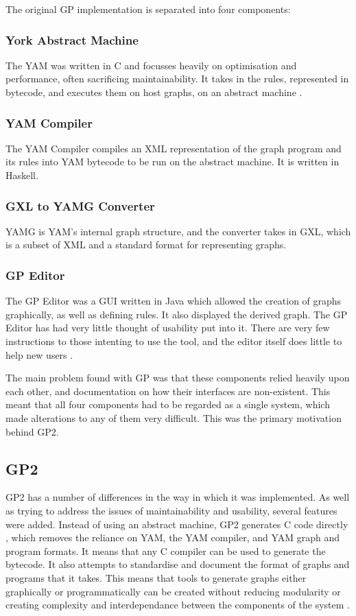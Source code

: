 \documentclass{UoYCSproject}
\begin{document}
The original GP implementation is separated into four components:
\subsubsection{York Abstract Machine}
The YAM was written in C and focusses heavily on optimisation and performance, often sacrificing maintainability. It takes in the rules, represented in bytecode, and executes them on host graphs, on an abstract machine \cite[p. 13]{gp2_ide}.
\subsubsection{YAM Compiler}
The YAM Compiler compiles an XML representation of the graph program and its rules into YAM bytecode to be run on the abstract machine. It is written in Haskell.
\subsubsection{GXL to YAMG Converter}
YAMG is YAM's internal graph structure, and the converter takes in GXL, which is a subset of XML and a standard format for representing graphs.
\subsubsection{GP Editor}
The GP Editor was a GUI written in Java which allowed the creation of graphs graphically, as well as defining rules. It also displayed the derived graph.
The GP Editor has had very little thought of usability put into it\cite[p. 35]{gp_ge}. There are very few instructions to those intenting to use the tool, and the editor itself does little to help new users \cite[p. 44, 45]{gp_ui}.

The main problem found with GP was that these components relied heavily upon each other, and documentation on how their interfaces are non-existent. %
This meant that all four components had to be regarded as a single system, which made alterations to any of them very difficult. This was the primary motivation behind GP2.

\subsection{GP2}
GP2 has a number of differences in the way in which it was implemented. As well as trying to address the issues of maintainability and usability, several features were added.
Instead of using an abstract machine, GP2 generates C code directly \cite{chris_compiler}, which removes the reliance on YAM, the YAM compiler, and YAM graph and program formats. It means that any C compiler can be used to generate the bytecode. It also attempts to standardise and document the format of graphs and programs that it takes. This means that tools to generate graphs either graphically or programmatically can be created without reducing modularity or creating complexity and interdependance between the components of the system \cite{gp2_ide}. %
\end{document}
